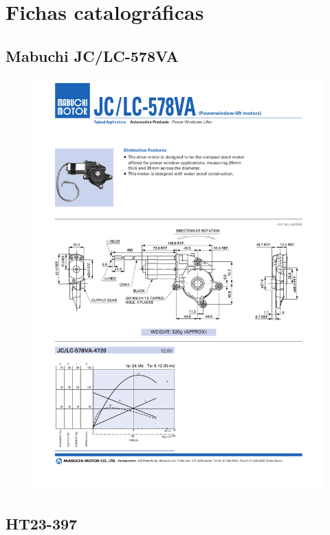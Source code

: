 \chapter{Fichas catalográficas}

\section{Mabuchi JC/LC-578VA}

\label{Mabuchi}

\begin{figure}[h]   
\begin{centering}
\includegraphics[width=0.8\columnwidth]{datasheets/mabuchi.pdf}
\par\end{centering}

\end{figure}

\section{HT23-397}

\label{HT23}

